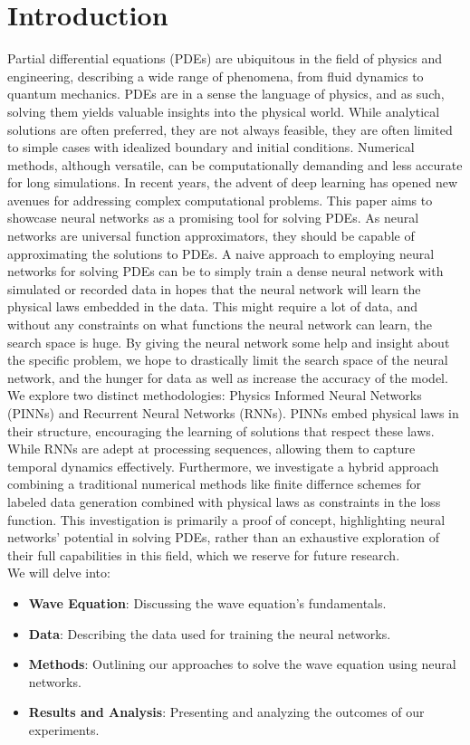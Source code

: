 \documentclass[twoside,11pt]{report}
\begin{document}
\section*{Introduction}

    Partial differential equations (PDEs) are ubiquitous in the field of physics and engineering,
    describing a wide range of phenomena, from fluid dynamics to quantum mechanics.
    PDEs are in a sense the language of physics, and as such, solving them yields valuable insights into
    the physical world. While analytical solutions are often preferred, they are not always feasible,
    they are often limited to simple cases with idealized boundary and initial conditions. Numerical methods, 
    although versatile, can be computationally 
    demanding and less accurate for long simulations. 
    In recent years, the advent 
    of deep learning has opened new avenues for addressing complex computational problems.
    This paper aims to showcase neural networks as a promising tool for solving PDEs. 
    As neural networks are universal function approximators, they should be 
    capable of approximating the solutions to PDEs. 
    A naive approach to employing neural networks for solving
    PDEs can be to simply train a dense neural network with simulated or recorded data in hopes that
    the neural network will learn the physical laws embedded in the data. This might require a lot of data,
    and without any constraints on what functions the neural network can learn, the search space is huge.
    By giving the neural network some help and insight about the specific
    problem, we hope to drastically limit the search space of the neural network, and the hunger for data
    as well as increase the accuracy of the model.
    We explore two distinct 
    methodologies: Physics Informed Neural Networks (PINNs) and Recurrent Neural Networks (RNNs). 
    PINNs embed physical laws in their structure, encouraging the learning of solutions that respect
    these laws. While RNNs are 
    adept at processing sequences, allowing them to capture temporal dynamics effectively. Furthermore, 
    we investigate a hybrid approach combining a traditional numerical methods like finite
    differnce schemes for labeled data generation combined with physical laws as constraints in the loss function.
    This investigation is primarily a proof of concept, highlighting neural networks' potential 
    in solving PDEs, rather than an exhaustive exploration of their full capabilities in this field, 
    which we reserve for future research.\\
    We will delve into:
    \begin{itemize}
    \item \textbf{Wave Equation}: Discussing the wave equation's fundamentals.
    \item \textbf{Data}: Describing the data used for training the neural networks.
    \item \textbf{Methods}: Outlining our approaches to solve the wave equation using neural networks.
    \item \textbf{Results and Analysis}: Presenting and analyzing the outcomes of our experiments.
    \end{itemize}
\end{document}
